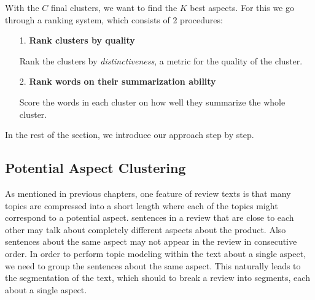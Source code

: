 With the $C$ final clusters, we want to find the $K$ best aspects. For this we go through a ranking system, which consists of 2 procedures:




\begin{itemize}
	\item[1.] \textbf{Rank clusters by quality}

		Rank the clusters by \emph{distinctiveness}, a metric for the quality of the cluster.

	\item[2.] \textbf{Rank words on their summarization ability}

		Score the words in each cluster on how well they summarize the whole cluster.
\end{itemize}

In the rest of the section, we introduce our approach step by step.

\subsection{Potential Aspect Clustering}

As mentioned in previous chapters, one feature of review texts is that many topics are compressed into a short length where each of the topics might correspond to a potential aspect. sentences in a review that are close to each other may talk about completely different aspects about the product. Also sentences about the same aspect may not appear in the review in consecutive order. In order to perform topic modeling within the text about a single aspect, we need to group the sentences about the same aspect. This naturally leads to the segmentation of the text, which should to break a review into segments, each about a single aspect. 

